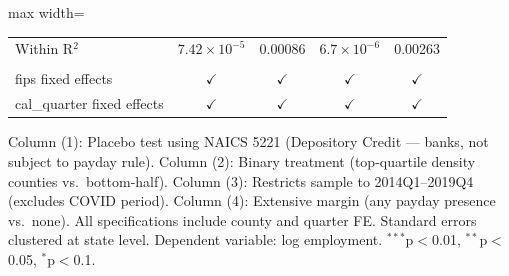 \begin{table}[htbp]
\begin{adjustbox}{max width=\textwidth}
\begin{tabular}{lcccc}
      Within R$^2$                       & $7.42\times 10^{-5}$  & 0.00086        & $6.7\times 10^{-6}$  & 0.00263\\  
       \\
      fips fixed effects                 & $\checkmark$          & $\checkmark$   & $\checkmark$         & $\checkmark$\\   
      cal\_quarter fixed effects         & $\checkmark$          & $\checkmark$   & $\checkmark$         & $\checkmark$\\   
      \bottomrule
   \end{tabular}
   \end{adjustbox}

   \par \raggedright
   Column (1): Placebo test using NAICS 5221 (Depository Credit --- banks, not subject to payday rule). Column (2): Binary treatment (top-quartile density counties vs.~bottom-half). Column (3): Restricts sample to 2014Q1--2019Q4 (excludes COVID period). Column (4): Extensive margin (any payday presence vs.~none). All specifications include county and quarter FE. Standard errors clustered at state level. Dependent variable: log employment. $^{***}$p$<$0.01, $^{**}$p$<$0.05, $^{*}$p$<$0.1.
\end{table}
